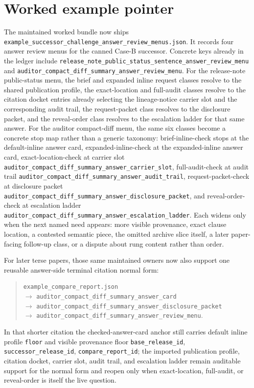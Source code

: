 \documentclass[11pt]{article}
\begin{document}
\section{Worked example pointer}
The maintained worked bundle now ships \nolinkurl{example_successor_challenge_answer_review_menus.json}.\cite{series:workedexample}
It records four answer review menus for the canned Case-B successor.
Concrete keys already in the ledger include \nolinkurl{release_note_public_status_sentence_answer_review_menu} and \nolinkurl{auditor_compact_diff_summary_answer_review_menu}.
For the release-note public-status menu, the brief and expanded inline request classes resolve to the shared publication profile, the exact-location and full-audit classes resolve to the citation docket entries already selecting the lineage-notice carrier slot and the corresponding audit trail, the request-packet class resolves to the disclosure packet, and the reveal-order class resolves to the escalation ladder for that same answer.
For the auditor compact-diff menu, the same six classes become a concrete stop map rather than a generic taxonomy: \textsf{brief-inline-check} stops at the default-inline answer card, \textsf{expanded-inline-check} at the expanded-inline answer card, \textsf{exact-location-check} at carrier slot \nolinkurl{auditor_compact_diff_summary_answer_carrier_slot}, \textsf{full-audit-check} at audit trail \nolinkurl{auditor_compact_diff_summary_answer_audit_trail}, \textsf{request-packet-check} at disclosure packet \nolinkurl{auditor_compact_diff_summary_answer_disclosure_packet}, and \textsf{reveal-order-check} at escalation ladder \nolinkurl{auditor_compact_diff_summary_answer_escalation_ladder}. Each widens only when the next named need appears: more visible provenance, exact clause location, a contested semantic piece, the omitted archive slice itself, a later paper-facing follow-up class, or a dispute about rung content rather than order.

For later terse papers, those same maintained owners now also support one reusable answer-side terminal citation normal form:
\begin{quote}\small
\nolinkurl{example_compare_report.json}\\
$\to$ \nolinkurl{auditor_compact_diff_summary_answer_card}\\
$\to$ \nolinkurl{auditor_compact_diff_summary_answer_disclosure_packet}\\
$\to$ \nolinkurl{auditor_compact_diff_summary_answer_review_menu}.
\end{quote}
In that shorter citation the checked-answer-card anchor still carries default inline profile \texttt{floor} and visible provenance floor \texttt{base\_release\_id}, \texttt{successor\_release\_id}, \texttt{compare\_report\_id}; the imported publication profile, citation docket, carrier slot, audit trail, and escalation ladder remain auditable support for the normal form and reopen only when exact-location, full-audit, or reveal-order is itself the live question.
\end{document}
